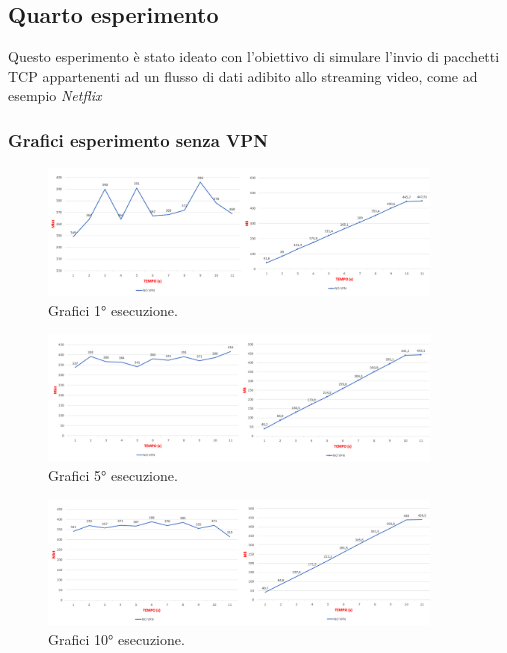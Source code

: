\newpage
\subsection{Quarto esperimento}
Questo esperimento è stato ideato con l'obiettivo di simulare l'invio di pacchetti TCP appartenenti ad un flusso di dati adibito allo streaming video, come ad esempio \emph{Netflix}
\subsubsection{Grafici esperimento senza VPN}

\begin{figure}[h] \includegraphics[width=0.9\textwidth] {Tesi magistrale/capitoli/images/37.png}
\centering
\caption{Grafici 1° esecuzione.}
\end{figure}

\begin{figure}[h] \includegraphics[width=0.9\textwidth] {Tesi magistrale/capitoli/images/38.png}
\centering
\caption{Grafici 5° esecuzione.}
\end{figure}

\begin{figure}[h] \includegraphics[width=0.9\textwidth] {Tesi magistrale/capitoli/images/39.png}
\centering
\caption{Grafici 10° esecuzione.}
\end{figure}

